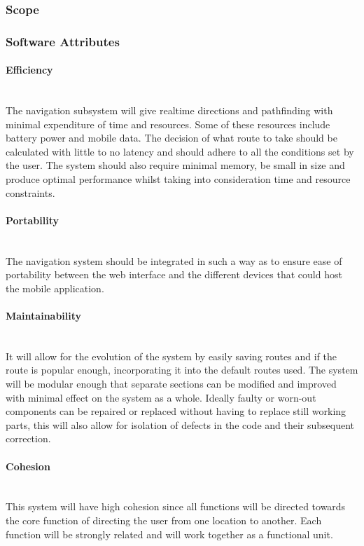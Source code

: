 \subsubsection{Scope}


\subsubsection{Software Attributes}

	\paragraph{Efficiency}
	\mbox{}\\
	The navigation subsystem will give realtime directions and pathfinding with minimal 
	expenditure of time and resources. Some of these resources include battery power and mobile 
	data. The decision of what route to take should be calculated with little to no latency and 
	should adhere to all the conditions set by the user. The system should also require minimal 
	memory, be small in size and produce optimal performance whilst taking into consideration 
	time and resource constraints.

	\paragraph{Portability}
	\mbox{}\\
	The navigation system should be integrated in such a way as to ensure ease of portability
	 between the web interface and the different devices that could host the mobile application. 

	\paragraph{Maintainability}
	\mbox{}\\
	It will allow for the evolution of the system by easily saving routes and if the route is 
	popular enough, incorporating it into the default routes used. The system will be modular
	 enough that separate sections can be modified and improved with minimal effect on the 
	 system as a whole. Ideally faulty or worn-out components can be repaired or replaced
	  without having to replace still working parts, this will also allow for isolation of
	  defects in the code and their subsequent correction.
	
	\paragraph{Cohesion}
	\mbox{}\\
	This system will have high cohesion since all functions will be directed towards the core
	 function of directing the user from one location to another. Each function will be
	  strongly related and will work together as a functional unit.


